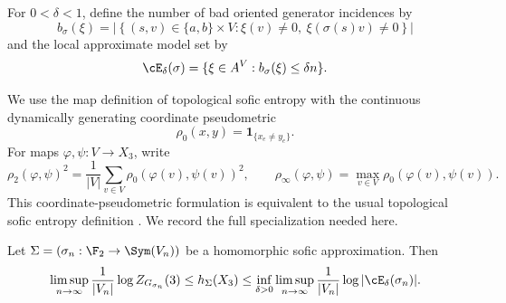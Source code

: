 For $0<\delta<1$, define the number of bad oriented generator incidences by
\[
 b_\sigma(\xi)=
 \left|\left\{(s,v)\in\{a,b\}\times V:
 \xi(v)\ne0,\ \xi(\sigma(s)v)\ne0\right\}\right|
\]
and the local approximate model set by
\[
 \cE_\delta(\sigma)
 =\{\xi\in A^V:b_\sigma(\xi)\le\delta n\}.
\]

We use the map definition of topological sofic entropy with the continuous
dynamically generating coordinate pseudometric
\[
 \rho_0(x,y)=\boldsymbol 1_{\{x_e\ne y_e\}}.
\]
For maps $\varphi,\psi:V\to X_3$, write
\[
 \rho_2(\varphi,\psi)^2
 =\frac1{|V|}\sum_{v\in V}\rho_0(\varphi(v),\psi(v))^2,
 \qquad
 \rho_\infty(\varphi,\psi)=\max_{v\in V}\rho_0(\varphi(v),\psi(v)).
\]
This coordinate-pseudometric formulation is equivalent to the usual
topological sofic entropy definition \citep{KerrLi2011,KerrLi2013}.  We record
the full specialization needed here.

\begin{lemma}\label{lem:local-model}
Let $\Sigma=(\sigma_n:\F_2\to\Sym(V_n))$ be a homomorphic sofic
approximation.  Then
\begin{equation}\label{eq:local-model}
 \limsup_{n\to\infty}\frac1{|V_n|}\log Z_{G_{\sigma_n}}(3)
 \le h_\Sigma(X_3)\le
 \inf_{\delta>0}\limsup_{n\to\infty}
 \frac1{|V_n|}\log|\cE_\delta(\sigma_n)|.
\end{equation}
\end{lemma}

